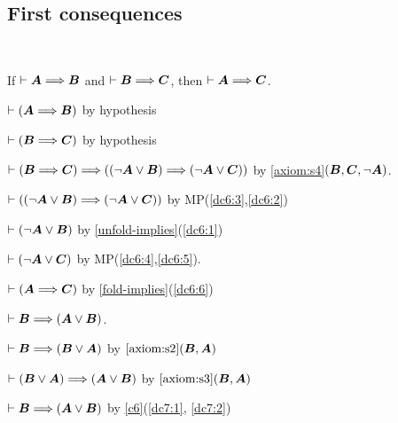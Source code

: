 \subsection{First consequences} \ 

\begin{dc}\label{c6}%
If $\vdash\boldsymbol{A}\Longrightarrow\boldsymbol{B}$ and $\vdash\boldsymbol{B}\Longrightarrow\boldsymbol{C}$,
then $\vdash\boldsymbol{A}\Longrightarrow\boldsymbol{C}$.
\end{dc}

\begin{pf}
\item\label{dc6:1}\Pf $\vdash(\boldsymbol{A}\Longrightarrow\boldsymbol{B})$
  by hypothesis
\item\label{dc6:2} $\vdash(\boldsymbol{B}\Longrightarrow\boldsymbol{C})$
  by hypothesis
\item\label{dc6:3} $\vdash(\boldsymbol{B}\Longrightarrow\boldsymbol{C})\Longrightarrow((\neg\boldsymbol{A}\lor\boldsymbol{B})\Longrightarrow(\neg\boldsymbol{A}\lor\boldsymbol{C}))$
  by \ref{axiom:s4}$(\boldsymbol{B},\boldsymbol{C},\neg\boldsymbol{A})$.
\item\label{dc6:4} $\vdash((\neg\boldsymbol{A}\lor\boldsymbol{B})\Longrightarrow(\neg\boldsymbol{A}\lor\boldsymbol{C}))$
  by MP(\ref{dc6:3},\ref{dc6:2})
\item\label{dc6:5} $\vdash(\neg\boldsymbol{A}\lor\boldsymbol{B})$
  by \ref{unfold-implies}(\ref{dc6:1})
\item\label{dc6:6} $\vdash(\neg\boldsymbol{A}\lor\boldsymbol{C})$ by MP(\ref{dc6:4},\ref{dc6:5}).
\item\label{dc6:7} $\vdash(\boldsymbol{A}\Longrightarrow\boldsymbol{C})$ by \ref{fold-implies}(\ref{dc6:6})
\end{pf}

\begin{dc}\label{c7}%
$\vdash\boldsymbol{B}\Longrightarrow(\boldsymbol{A}\lor\boldsymbol{B})$.
\end{dc}

\begin{pf}
\item\label{dc7:1}\Pf $\vdash\boldsymbol{B}\Longrightarrow(\boldsymbol{B}\lor\boldsymbol{A})$
  by $\ref{axiom:s2}(\boldsymbol{B},\boldsymbol{A})$
\item\label{dc7:2} $\vdash(\boldsymbol{B}\lor\boldsymbol{A})\Longrightarrow(\boldsymbol{A}\lor\boldsymbol{B})$
  by $\ref{axiom:s3}(\boldsymbol{B},\boldsymbol{A})$
\item $\vdash\boldsymbol{B}\Longrightarrow(\boldsymbol{A}\lor\boldsymbol{B})$
  by \ref{c6}(\ref{dc7:1}, \ref{dc7:2})
\end{pf}

